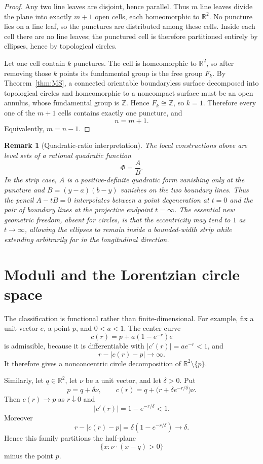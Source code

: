 \documentclass[11pt]{article}
\newtheorem{remark}[theorem]{Remark}
\newcommand{\R}{\mathbb{R}}
\newcommand{\Z}{\mathbb{Z}}
\begin{document}
\begin{proof}
Any two line leaves are disjoint, hence parallel. Thus $m$ line leaves divide the plane into exactly $m+1$ open cells, each homeomorphic to $\R^2$. No puncture lies on a line leaf, so the punctures are distributed among these cells. Inside each cell there are no line leaves; the punctured cell is therefore partitioned entirely by ellipses, hence by topological circles.

Let one cell contain $k$ punctures. The cell is homeomorphic to $\R^2$, so after removing those $k$ points its fundamental group is the free group $F_k$. By Theorem~\ref{thm:MS}, a connected orientable boundaryless surface decomposed into topological circles and homeomorphic to a noncompact surface must be an open annulus, whose fundamental group is $\Z$. Hence $F_k\cong\Z$, so $k=1$. Therefore every one of the $m+1$ cells contains exactly one puncture, and
\[
n=m+1.
\]
Equivalently, $m=n-1$.
\end{proof}

\begin{remark}[Quadratic-ratio interpretation]\label{rem:quadratic-ratio}
The local constructions above are level sets of a rational quadratic function
\[
\Phi=\frac{A}{B}.
\]
In the strip case, $A$ is a positive-definite quadratic form vanishing only at the puncture and $B=(y-a)(b-y)$ vanishes on the two boundary lines. Thus the pencil $A-tB=0$ interpolates between a point degeneration at $t=0$ and the pair of boundary lines at the projective endpoint $t=\infty$. The essential new geometric freedom, absent for circles, is that the eccentricity may tend to $1$ as $t\to\infty$, allowing the ellipses to remain inside a bounded-width strip while extending arbitrarily far in the longitudinal direction.
\end{remark}


\section{Moduli and the Lorentzian circle space}

The classification is functional rather than finite-dimensional. For example, fix a unit vector $e$, a point $p$, and $0<a<1$. The center curve
\[
c(r)=p+a(1-e^{-r})e
\]
is admissible, because it is differentiable with $|c'(r)|=ae^{-r}<1$, and
\[
r-|c(r)-p|\longrightarrow\infty.
\]
It therefore gives a nonconcentric circle decomposition of $\R^2\setminus\{p\}$.

Similarly, let $q\in\R^2$, let $\nu$ be a unit vector, and let $\delta>0$. Put
\[
p=q+\delta\nu,
\qquad
c(r)=q+\bigl(r+\delta e^{-r/\delta}\bigr)\nu.
\]
Then $c(r)\to p$ as $r\downarrow0$ and
\[
|c'(r)|=1-e^{-r/\delta}<1.
\]
Moreover
\[
r-|c(r)-p|=\delta(1-e^{-r/\delta})\longrightarrow\delta.
\]
Hence this family partitions the half-plane
\[
\{x:\nu\cdot(x-q)>0\}
\]
minus the point $p$.
\end{document}
